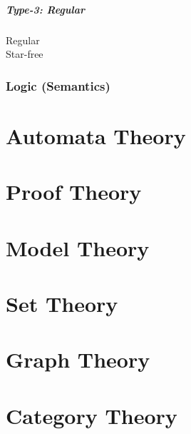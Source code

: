 \documentclass{article}
\begin{document}
\subsubsection{Type-3: Regular}

    \begin{description}

    \item[Regular]

    \item[Star-free]

    \end{description}

\section{Logic (Semantics)}


\part{Automata Theory}


\part{Proof Theory}


\part{Model Theory}


\part{Set Theory}


\part{Graph Theory}


\part{Category Theory}

\end{document}
